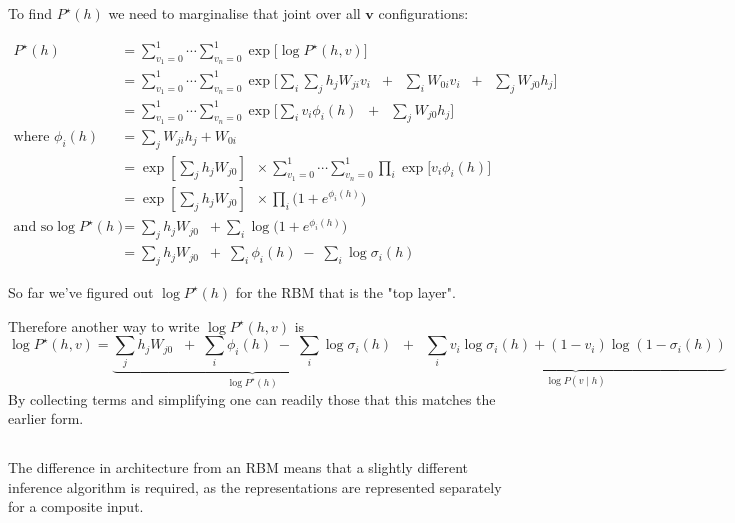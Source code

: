 
To find $P^\star(h)$ we need to marginalise that joint over all $\mathbf{v}$ configurations:

$$
 \begin{aligned}
P^\star(h) &= \sum_{v_1=0}^1 \cdots \sum_{v_n=0}^1 \exp \bigg[  \log P^{\star}(h,v) \bigg] \\
&= \sum_{v_1=0}^1 \cdots \sum_{v_n=0}^1 \exp \bigg[  \sum_i  \sum_j h_j W_{ji} v_i \;\; + \;\; \sum_i W_{0i} v_i \;\; + \;\; \sum_j W_{j0} h_j \bigg] \\
&= \sum_{v_1=0}^1 \cdots \sum_{v_n=0}^1 \exp \bigg[  \sum_i v_i \phi_i(h)  \;\; + \;\; \sum_j W_{j0} h_j \bigg] \\
\text{where } \phi_i(h) &= \sum_j W_{ji} h_j + W_{0i} \\
&= \exp\left[ \sum_j h_j  W_{j0} \right] \;\; \times \sum_{v_1=0}^1 \cdots \sum_{v_n=0}^1 \prod_i \exp\bigg[ v_i \phi_i(h) \bigg] \\
&= \exp\left[\sum_j h_j  W_{j0}\right] \;\; \times \prod_i \bigg( 1 + e^{\phi_i(h) } \bigg) \\
\text{and so}
\log P^\star(h) &= \sum_j h_j  W_{j0} \;\; +  \sum_i \log \bigg( 1 + e^{\phi_i(h) } \bigg)
\\
&= \sum_j h_j  W_{j0} \;\; + \; \sum_i \phi_i(h) \;  - \; \sum_i \log \sigma_i(h)
\end{aligned}
$$

So far we've figured out $\log P^\star(h)$ for the RBM that is the "top layer".

Therefore another way to write $\log P^\star(h,v)$ is
$$
\log P^\star(h,v) = \underbrace{\sum_j h_j  W_{j0} \;\; + \; \sum_i \phi_i(h) \;  - \; \sum_i \log \sigma_i(h)}_{\log P^\star(h)} \;\;+\;\; \underbrace{\sum_i v_i \log \sigma_i(h) + (1-v_i) \log (1 - \sigma_i(h))}_{\log P(v \mid h)}
$$
By collecting terms and simplifying one can readily those that this matches the earlier form.

\subsection{}


The difference in architecture from an RBM means that a slightly different inference algorithm is required, as the representations are represented separately for a composite input.

